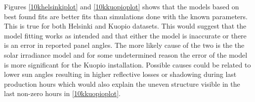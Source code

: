 \begin{figure}[h]
\begin{floatrow}
\end{floatrow}
\end{figure}


Figures \ref{10khelsinkiplot} and \ref{10kkuopioplot} shows that the models based on best found fits are better fits than simulations done with the known parameters. This is true for both Helsinki and Kuopio datasets. This would suggest that the model fitting works as intended and that either the model is inaccurate or there is an error in reported panel angles. The more likely cause of the two is the the solar irradiance model and for some undetermined reason the error of the model is more significant for the Kuopio installation. Possible causes could be related to lower sun angles resulting in higher reflective losses or shadowing during last production hours which would also explain the uneven structure visible in the last non-zero hours in \ref{10kkuopioplot}.





